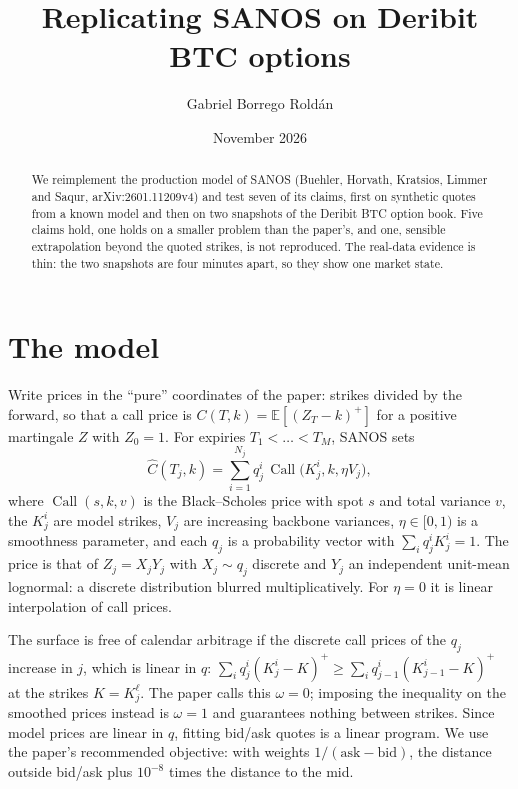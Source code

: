\documentclass[11pt,a4paper]{article}
\title{Replicating SANOS on Deribit BTC options}
\author{Gabriel Borrego Rold\'an}
\date{November 2026}
\newcommand{\Call}{\operatorname{Call}}
\begin{document}
\maketitle

\begin{abstract}
We reimplement the production model of SANOS (Buehler, Horvath, Kratsios, Limmer and Saqur,
arXiv:2601.11209v4) and test seven of its claims, first on synthetic quotes from a known
model and then on two snapshots of the Deribit BTC option book. Five claims hold, one holds
on a smaller problem than the paper's, and one, sensible extrapolation beyond the quoted
strikes, is not reproduced. The real-data evidence is thin: the two snapshots are four
minutes apart, so they show one market state.
\end{abstract}

\section{The model}

Write prices in the ``pure'' coordinates of the paper: strikes divided by the forward, so
that a call price is $C(T,k)=\mathbb{E}[(Z_T-k)^+]$ for a positive martingale $Z$ with
$Z_0=1$. For expiries $T_1<\dots<T_M$, SANOS sets
\begin{equation}
  \hat C(T_j,k)=\sum_{i=1}^{N_j} q_j^i\,\Call\bigl(K_j^i,k,\eta V_j\bigr),
\end{equation}
where $\Call(s,k,v)$ is the Black--Scholes price with spot $s$ and total variance $v$,
the $K_j^i$ are model strikes, $V_j$ are increasing backbone variances, $\eta\in[0,1)$
is a smoothness parameter, and each $q_j$ is a probability vector with
$\sum_i q_j^iK_j^i=1$. The price is that of $Z_j=X_jY_j$ with $X_j\sim q_j$ discrete and
$Y_j$ an independent unit-mean lognormal: a discrete distribution blurred multiplicatively.
For $\eta=0$ it is linear interpolation of call prices.

The surface is free of calendar arbitrage if the discrete call prices of the $q_j$ increase
in $j$, which is linear in $q$:
$\sum_i q_j^i(K_j^i-K)^+\ge\sum_i q_{j-1}^i(K_{j-1}^i-K)^+$ at the strikes $K=K_j^\ell$.
The paper calls this $\omega=0$; imposing the inequality on the smoothed prices instead is
$\omega=1$ and guarantees nothing between strikes. Since model prices are linear in $q$,
fitting bid/ask quotes is a linear program. We use the paper's recommended objective: with
weights $1/(\text{ask}-\text{bid})$, the distance outside bid/ask plus $10^{-8}$ times the
distance to the mid.
\end{document}
